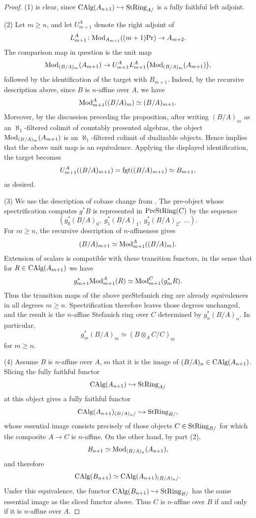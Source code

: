 \documentclass[11pt]{book}
\begin{document}
	\begin{proof}
		(1) is clear, since ${\textup{CAlg}}(A_{n+1}) \hookrightarrow {\textup{StRing}}_{A/}$ is a fully faithful left adjoint.

		(2) Let $m \geq n$, and let $U^A_{m+1}$ denote the right adjoint of
		\[
			L^A_{m+1}\colon {\textup{Mod}}_{A_{m+1}}((m+1)\textup{Pr}) \to A_{m+2}.
		\]
		The comparison map in question is the unit map
		\[
			{\textup{Mod}}_{(B/A)_m}(A_{m+1})
			\to
			U^A_{m+1}L^A_{m+1}\bigl({\textup{Mod}}_{(B/A)_m}(A_{m+1})\bigr),
		\]
		followed by the identification of the target with $B_{m+1}$. Indeed, by the recursive description above, since $B$ is $n$-affine over $A$, we have
		\[
			{\textup{Mod}}^A_{m+1}((B/A)_m)
			\simeq
			(B/A)_{m+1}.
		\]
		Moreover, by the discussion preceding the proposition, after writing $(B/A)_m$ as an $\aleph_1$-filtered colimit of countably presented algebras, the object ${\textup{Mod}}_{(B/A)_m}(A_{m+1})$ is an $\aleph_1$-filtered colimit of dualizable objects. Hence  implies that the above unit map is an equivalence. Applying the displayed identification, the target becomes
		\[
			U^A_{m+1}((B/A)_{m+1})
			=
			\operatorname{fgt}((B/A)_{m+1})
			\simeq
			B_{m+1},
		\]
		as desired.

		(3) We use the description of cobase change from . The pre-object whose spectrification computes $g^*B$ is represented in ${\textup{PreStRing}}(C)$ by the sequence
		\[
			(g_0^*(B/A)_0,\; g_1^*(B/A)_1,\; g_2^*(B/A)_2,\; \dots).
		\]
		For $m \geq n$, the recursive description of $n$-affineness gives
		\[
			(B/A)_{m+1}
			\simeq
			{\textup{Mod}}^A_{m+1}((B/A)_m).
		\]
		Extension of scalars is compatible with these transition functors, in the sense that for $R \in {\textup{CAlg}}(A_{m+1})$ we have
		\[
			g_{m+1}^*{\textup{Mod}}^A_{m+1}(R)
			\simeq
			{\textup{Mod}}^C_{m+1}(g_m^*R).
		\]
		Thus the transition maps of the above preStefanich ring are already equivalences in all degrees $m \geq n$. Spectrification therefore leaves those degrees unchanged, and the result is the $n$-affine Stefanich ring over $C$ determined by $g_n^*(B/A)_n$. In particular,
		\[
			g_m^*(B/A)_m \simeq (B \otimes_A C/C)_m
		\]
		for $m \geq n$.

		(4) Assume $B$ is $n$-affine over $A$, so that it is the image of $(B/A)_n \in {\textup{CAlg}}(A_{n+1})$. Slicing the fully faithful functor
		\[
			{\textup{CAlg}}(A_{n+1}) \hookrightarrow {\textup{StRing}}_{A/}
		\]
		at this object gives a fully faithful functor
		\[
			{\textup{CAlg}}(A_{n+1})_{(B/A)_n/}
			\hookrightarrow
			{\textup{StRing}}_{B/},
		\]
		whose essential image consists precisely of those objects $C \in {\textup{StRing}}_{B/}$ for which the composite $A \to C$ is $n$-affine.
		On the other hand, by part (2),
		\[
			B_{n+1}
			\simeq
			{\textup{Mod}}_{(B/A)_n}(A_{n+1}),
		\]
		and therefore
		\[
			{\textup{CAlg}}(B_{n+1})
			\simeq
			{\textup{CAlg}}(A_{n+1})_{(B/A)_n/}.
		\]
		Under this equivalence, the functor ${\textup{CAlg}}(B_{n+1}) \hookrightarrow {\textup{StRing}}_{B/}$ has the same essential image as the sliced functor above. Thus $C$ is $n$-affine over $B$ if and only if it is $n$-affine over $A$.


\end{proof}
\end{document}
